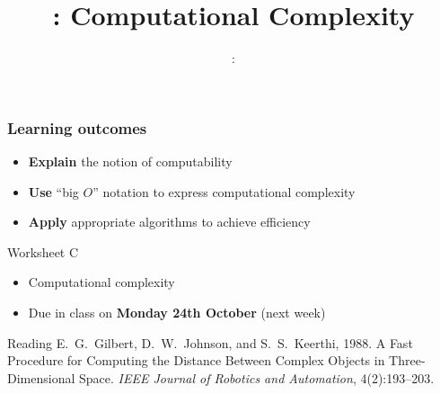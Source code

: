 \usepackage{../../beamerthemeFalmouthGamesAcademy}
\usepackage{multimedia}
\graphicspath{ {../../} }

\lstset{language=Python
}

\usepackage[normalem]{ulem}
\usepackage{wasysym}

\usepackage{pdfpages}

\usetikzlibrary{arrows,automata}




\title{\sessionnumber: Computational Complexity}
\subtitle{\modulecode: \moduletitle}

\frame{\titlepage} 

\begin{frame}
	\frametitle{Learning outcomes}
	\begin{itemize}
		\item \textbf{Explain} the notion of computability
		\item \textbf{Use} ``big $O$'' notation to express computational complexity
		\item \textbf{Apply} appropriate algorithms to achieve efficiency
	\end{itemize}
\end{frame}

\begin{frame}{Worksheet C}
	\begin{itemize}
		\item Computational complexity
		\item Due in class on \textbf{Monday 24th October} (next week)
	\end{itemize}
\end{frame}

\begin{frame}{Reading}
	E.\ G.\ Gilbert, D.\ W.\ Johnson, and S.\ S.\ Keerthi, 1988.
	A Fast Procedure for Computing the Distance Between Complex Objects in Three-Dimensional Space.
	\emph{IEEE Journal of Robotics and Automation},
	4(2):193--203.
\end{frame}








